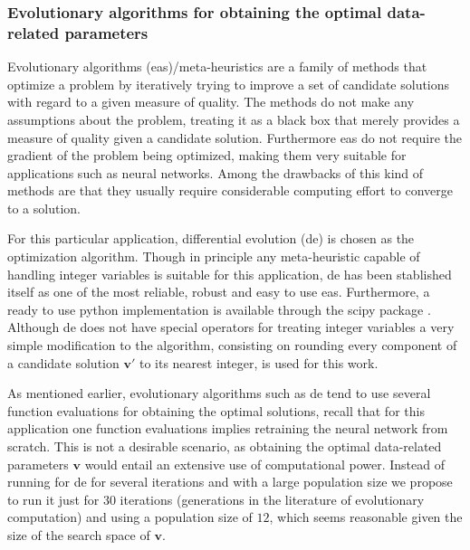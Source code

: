 \subsubsection{Evolutionary algorithms for obtaining the optimal data-related parameters}
\label{sec:ea_optimization_process}

Evolutionary algorithms (\glspl{ea})/meta-heuristics are a family of methods that optimize a problem by iteratively trying to improve a set of candidate solutions with regard to a given measure of quality. The methods do not make any assumptions about the problem, treating it as a black box that merely provides a measure of quality given a candidate solution. Furthermore \glspl{ea} do not require the gradient of the problem being optimized, making them very suitable for applications such as neural networks. Among the drawbacks of this kind of methods are that they usually require considerable computing effort to converge to a solution.

For this particular application, differential evolution (\gls{de}) \cite{Storn1997} is chosen as the optimization algorithm. Though in principle any meta-heuristic capable of handling integer variables is suitable for this application, \gls{de} has been stablished itself as one of the most reliable, robust and easy to use \glspl{ea}. Furthermore, a ready to use python implementation is available through the scipy package \cite{scipy}. Although \gls{de} does not have special operators for treating integer variables a very simple modification to the algorithm, consisting on rounding every component of a candidate solution $\mathbf{v}'$ to its nearest integer, is used for this work.

As mentioned earlier, evolutionary algorithms such as \gls{de} tend to use several function evaluations for obtaining the optimal solutions, recall that for this application one function evaluations implies retraining the  neural network from scratch. This is not a desirable scenario, as obtaining the optimal data-related parameters $\mathbf{v}$ would entail an extensive use of computational power. Instead of running for \gls{de} for several iterations and with a large population size we propose to run it just for $30$ iterations (generations in the literature of evolutionary computation) and using a population size of $12$, which seems reasonable given the size of the search space of $\mathbf{v}$. 

